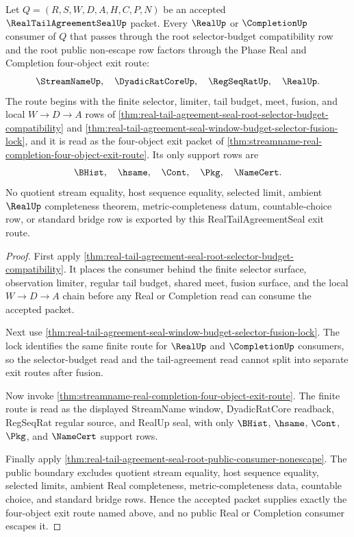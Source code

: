 \begin{theorem}
\label{thm:real-tail-agreement-seal-l10-four-object-exit-route}
Let $Q=(R,S,W,D,A,H,C,P,N)$ be an accepted $\RealTailAgreementSealUp$ packet. Every $\RealUp$ or $\CompletionUp$ consumer of $Q$ that passes through the root selector-budget compatibility row and the root public non-escape row factors through the Phase Real and Completion four-object exit route:
$$
\StreamNameUp,\quad \DyadicRatCoreUp,\quad \RegSeqRatUp,\quad \RealUp.
$$
The route begins with the finite selector, limiter, tail budget, meet, fusion, and local $W \to D \to A$ rows of \autoref{thm:real-tail-agreement-seal-root-selector-budget-compatibility} and \autoref{thm:real-tail-agreement-seal-window-budget-selector-fusion-lock}, and it is read as the four-object exit packet of \autoref{thm:streamname-real-completion-four-object-exit-route}. Its only support rows are
$$
\BHist,\quad \hsame,\quad \Cont,\quad \Pkg,\quad \NameCert.
$$
No quotient stream equality, host sequence equality, selected limit, ambient $\RealUp$ completeness theorem, metric-completeness datum, countable-choice row, or standard bridge row is exported by this RealTailAgreementSeal exit route.
\end{theorem}
\begin{proof}
First apply \autoref{thm:real-tail-agreement-seal-root-selector-budget-compatibility}. It places the consumer behind the finite selector surface, observation limiter, regular tail budget, shared meet, fusion surface, and the local $W \to D \to A$ chain before any Real or Completion read can consume the accepted packet.

Next use \autoref{thm:real-tail-agreement-seal-window-budget-selector-fusion-lock}. The lock identifies the same finite route for $\RealUp$ and $\CompletionUp$ consumers, so the selector-budget read and the tail-agreement read cannot split into separate exit routes after fusion.

Now invoke \autoref{thm:streamname-real-completion-four-object-exit-route}. The finite route is read as the displayed StreamName window, DyadicRatCore readback, RegSeqRat regular source, and RealUp seal, with only $\BHist$, $\hsame$, $\Cont$, $\Pkg$, and $\NameCert$ support rows.

Finally apply \autoref{thm:real-tail-agreement-seal-root-public-consumer-nonescape}. The public boundary excludes quotient stream equality, host sequence equality, selected limits, ambient Real completeness, metric-completeness data, countable choice, and standard bridge rows. Hence the accepted packet supplies exactly the four-object exit route named above, and no public Real or Completion consumer escapes it.
\end{proof}

